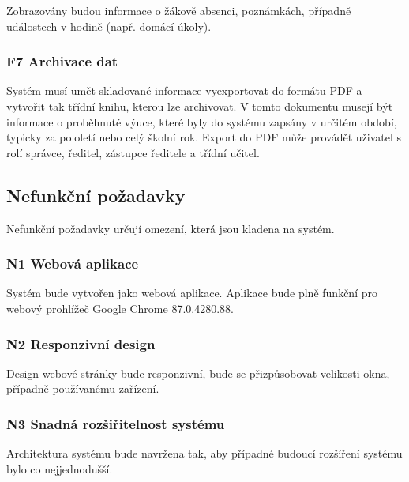 Zobrazovány budou informace o žákově absenci, poznámkách, případně událostech v hodině (např. domácí úkoly).

\subsubsection*{F7 Archivace dat}
Systém musí umět skladované informace vyexportovat do formátu PDF a vytvořit tak třídní knihu, kterou lze archivovat. V tomto dokumentu musejí být informace o proběhnuté výuce, které byly do systému zapsány v určitém období, typicky za pololetí nebo celý školní rok.
Export do PDF může provádět uživatel s rolí správce, ředitel, zástupce ředitele a třídní učitel.


\subsection{Nefunkční požadavky}
Nefunkční požadavky určují omezení, která jsou kladena na systém. 
\subsubsection*{N1 Webová aplikace}
Systém bude vytvořen jako webová aplikace. Aplikace bude plně funkční pro webový prohlížeč Google Chrome 87.0.4280.88. 

\subsubsection*{N2 Responzivní design}
Design webové stránky bude responzivní, bude se přizpůsobovat velikosti okna, případně používanému zařízení.

\subsubsection*{N3 Snadná rozšiřitelnost systému}
Architektura systému bude navržena tak, aby případné budoucí rozšíření systému bylo co nejjednodušší.

